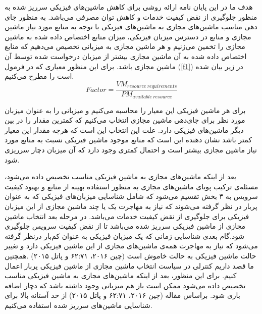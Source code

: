 هدف ما در این پایان نامه ارائه روشی برای کاهش ماشین‌های فیزیکی سرریز شده به منظور جلوگیری از نقض کیفیت خدمات و کاهش توان مصرفی می‌باشد. به منظور جای دهی مناسب ماشین‌های مجازی به ماشین‌های فیزیکی با توجه به منابع مورد نیاز ماشین مجازی و منابع در دسترس میزبان فیزیکی، میزان منابع اختصاص داده شده به ماشین مجازی را تخمین می‌زنیم و هر ماشین مجازی به میزبانی تخصیص می‌دهیم که منابع اختصاص داده شده به آن ماشین مجازی بیشتر از میزبان درخواست شده توسط آن ماشین مجازی باشد. برای این منظور معیاری که در فرمول
(\ref{f1})
 در زیر بیان شده است را مطرح می‌کنیم.
 \begin{equation}
Factor= \frac{VM_{resource\hspace{3pt} requirements}}{PM_{available\hspace{3pt} resource}}
\label{f1}
 \end{equation}
                                                                                


برای هر ماشین فیزیکی این معیار را محاسبه می‌کنیم و میزبانی را به عنوان میزبان مورد نظر برای جای‌دهی ماشین مجازی انتخاب می‌کنیم که کمترین مقدار را در بین دیگر ماشین‌های فیزیکی دارد. علت این انتخاب این است که هرچه مقدار این معیار کمتر باشد نشان دهنده این است که منابع موجود ماشین فیزیکی نسبت به منابع مورد نیاز ماشین مجازی بیشتر است و احتمال کمتری وجود دارد که آن میزبان دچار سرریزی شود. 


بعد از اینکه ماشین‌های مجازی به ماشین فیزیکی مناسب تخصیص داده می‌شود، مسئله‌ی ترکیب پویای ماشین‌های مجازی به منظور استفاده بهینه از منابع و بهبود کیفیت سرویس به ۳ بخش تقسیم می‌شود که شامل شناسایی میزبان‌های فیزیکی که به عنوان پربار در نظر گرفته می‌شوند که نیاز به مهاجرت یک یا چند ماشین مجازی از این میزبان فیزیکی برای جلوگیری از نقض کیفیت خدمات می‌باشد. در مرحله بعد انتخاب ماشین مجازی از ماشین فیزیکی سرریز شده می‌باشد تا از نقض کیفیت سرویس جلوگیری شود.گام بعدی شناسایی زمانی که یک میزبان فیزیکی به عنوان کم‌بار
 در‌نظر گرفته می‌شود که نیاز به مهاجرت همه‌ی ماشین‌های مجازی از این ماشین فیزیکی دارد و تغییر حالت ماشین فیزیکی به حالت خاموش است (چین ۲۰۱۶، ۶۲:۷۱ و پاتل ۲۰۱۵)
.همچنین ما قصد داریم کنترلی در سیاست انتخاب ماشین مجازی از ماشین فیزیکی پربار اعمال کنیم. برای این منظور، بعد از اینکه ماشین‌های مجازی به ماشین فیزیکی مناسب تخصیص داده می‌شود ممکن است باز هم میزبانی وجود داشته باشد که دچار اضافه باری شود. براساس مقاله  (چین ۲۰۱۶، ۶۲:۷۱ و پاتل ۲۰۱۵)
 از حد آستانه بالا
  برای شناسایی ماشین‌های سرریز شده استفاده می‌کنیم. 

